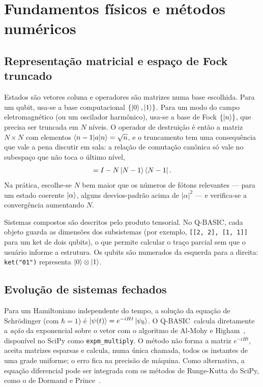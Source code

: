 \documentclass[11pt,a4paper]{article}
\newcommand{\qbasic}{\textsc{Q-BASIC}}
\newcommand{\codigo}[1]{\texttt{#1}}
\begin{document}
\section{Fundamentos físicos e métodos numéricos}\label{sec:fundamentos}

\subsection{Representação matricial e espaço de Fock truncado}

Estados são vetores coluna e operadores são matrizes numa base escolhida. Para um qubit,
usa-se a base computacional $\{\ket{0}, \ket{1}\}$. Para um modo do campo
eletromagnético (ou um oscilador harmônico), usa-se a base de Fock $\{\ket{n}\}$, que
precisa ser truncada em $N$ níveis. O operador de destruição é então a matriz
$N\times N$ com elementos $\braket{n-1|a|n} = \sqrt{n}$, e o truncamento tem uma
consequência que vale a pena discutir em sala: a relação de comutação canônica só vale
no subespaço que não toca o último nível,
\begin{equation}
  [a, a^\dagger] = I - N\ket{N-1}\bra{N-1}.
\end{equation}
Na prática, escolhe-se $N$ bem maior que os números de fótons relevantes --- para um
estado coerente $\ket{\alpha}$, alguns desvios-padrão acima de $|\alpha|^2$ --- e
verifica-se a convergência aumentando $N$.

Sistemas compostos são descritos pelo produto tensorial. No \qbasic, cada objeto guarda as
dimensões dos subsistemas (por exemplo, \codigo{[[2, 2], [1, 1]]} para um ket de dois
qubits), o que permite calcular o traço parcial sem que o usuário informe a estrutura. Os
qubits são numerados da esquerda para a direita: \codigo{ket("01")} representa
$\ket{0}\otimes\ket{1}$.

\subsection{Evolução de sistemas fechados}

Para um Hamiltoniano independente do tempo, a solução da equação de Schrödinger (com
$\hbar = 1$) é $\ket{\psi(t)} = e^{-iHt}\ket{\psi_0}$. O \qbasic\ calcula diretamente a
\emph{ação} da exponencial sobre o vetor com o algoritmo de Al-Mohy e
Higham~\cite{almohy2011expmv}, disponível no SciPy como \codigo{expm\_multiply}. O método
não forma a matriz $e^{-iHt}$, aceita matrizes esparsas e calcula, numa única chamada,
todos os instantes de uma grade uniforme; o erro fica na precisão de máquina. Como
alternativa, a equação diferencial pode ser integrada com os métodos de Runge-Kutta do
SciPy, como o de Dormand e Prince~\cite{dormand1980rk}.
\end{document}

